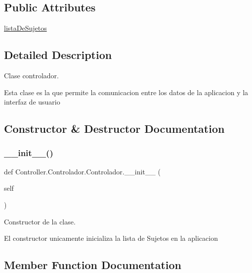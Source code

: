 \subsection*{Public Attributes}
\begin{DoxyCompactItemize}
\item 
\hyperlink{class_controller_1_1_controlador_1_1_controlador_ac7f14b4e1c0f2bf39ef0ddf2ae687898}{lista\+De\+Sujetos}
\end{DoxyCompactItemize}


\subsection{Detailed Description}
Clase controlador. 

Esta clase es la que permite la comunicacion entre los datos de la aplicacion y la interfaz de usuario 

\subsection{Constructor \& Destructor Documentation}
\mbox{\label{class_controller_1_1_controlador_1_1_controlador_ad30f895c86fb2085fbd3b2c0a1c9f38c}} 
\subsubsection{\texorpdfstring{\+\_\+\+\_\+init\+\_\+\+\_\+()}{\_\_init\_\_()}}
{\footnotesize\ttfamily def Controller.\+Controlador.\+Controlador.\+\_\+\+\_\+init\+\_\+\+\_\+ (\begin{DoxyParamCaption}\item[{}]{self }\end{DoxyParamCaption})}



Constructor de la clase. 

El constructor unicamente inicializa la lista de Sujetos en la aplicacion 

\subsection{Member Function Documentation}
\mbox{\label{class_controller_1_1_controlador_1_1_controlador_a4c342a4b7f56c2f8a566cdf62030816c}} 
